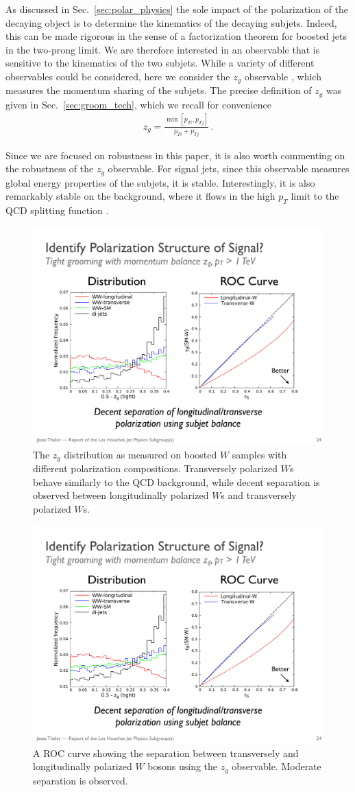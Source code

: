 \documentclass[11pt,letterpaper]{article}
\DeclareRobustCommand{\Sec}[1]{Sec.~\ref{#1}}
\begin{document}
As discussed in \Sec{sec:polar_physics} the sole impact of the polarization of the decaying object is to determine the kinematics of the decaying subjets. Indeed, this can be made rigorous in the sense of a factorization theorem for boosted jets in the two-prong limit. We are therefore interested in an observable that is sensitive to the kinematics of the two subjets. While a variety of different observables could be considered, here we consider the $z_g$ observable \cite{Larkoski:2014wba,Larkoski:2014bia,Larkoski:2015lea}, which measures the momentum sharing of the subjets. The precise definition of $z_g$ was given in \Sec{sec:groom_tech}, which we recall for convenience
\begin{align}
z_g=\frac{\min\left[ p_{Ti}, p_{Tj}  \right]}{p_{Ti}+p_{Tj}}\,.
\end{align}

Since we are focused on robustness in this paper, it is also worth commenting on the robustness of the $z_g$ observable. For signal jets, since this observable measures global energy properties of the subjets, it is stable. Interestingly, it is also remarkably stable on the background, where it flows in the high $p_T$ limit to the QCD splitting function \cite{Larkoski:2014wba,Larkoski:2014bia,Larkoski:2015lea}.



\begin{figure}
\begin{center}
\includegraphics[width=0.3\columnwidth]{figures/z_g_polarize}
\end{center}
\caption{The $z_g$ distribution as measured on boosted $W$ samples with different polarization compositions. Transversely polarized $W$s behave similarly to the QCD background, while decent separation is observed between longitudinally polarized $W$s and transversely polarized $W$s.}
\label{z_g_dist}
\end{figure}

\begin{figure}
\begin{center}
\includegraphics[width=0.3\columnwidth]{figures/z_g_ROC}
\end{center}
\caption{A ROC curve showing the separation between transversely and longitudinally polarized $W$ bosons using the $z_g$ observable. Moderate separation is observed.}
\label{fig:z_g_ROC}
\end{figure}
\end{document}
